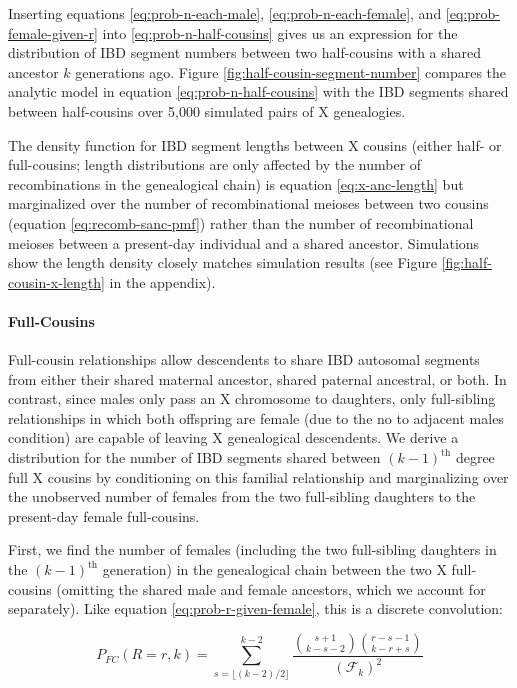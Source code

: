 \documentclass[11pt]{article}
\begin{document}
Inserting equations \eqref{eq:prob-n-each-male}, \eqref{eq:prob-n-each-female},
and \eqref{eq:prob-female-given-r} into \eqref{eq:prob-n-half-cousins} gives us
an expression for the distribution of IBD segment numbers between two
half-cousins with a shared ancestor $k$ generations ago. Figure
\ref{fig:half-cousin-segment-number} compares the analytic model in equation
\eqref{eq:prob-n-half-cousins} with the IBD segments shared between
half-cousins over 5,000 simulated pairs of X genealogies.

The density function for IBD segment lengths between X cousins (either half- or
full-cousins; length distributions are only affected by the number of
recombinations in the genealogical chain) is equation \eqref{eq:x-anc-length}
but marginalized over the number of recombinational meioses between two cousins
(equation \eqref{eq:recomb-sanc-pmf}) rather than the number of recombinational
meioses between a present-day individual and a shared ancestor. Simulations
show the length density closely matches simulation results (see Figure
\ref{fig:half-cousin-x-length} in the appendix).

\paragraph{Full-Cousins}
\label{sec:full-cousins}

Full-cousin relationships allow descendents to share IBD autosomal segments
from either their shared maternal ancestor, shared paternal ancestral, or both.
In contrast, since males only pass an X chromosome to daughters, only
full-sibling relationships in which both offspring are female (due to the no to
adjacent males condition) are capable of leaving X genealogical descendents. We
derive a distribution for the number of IBD segments shared between
$(k-1)^\text{th}$ degree full X cousins by conditioning on this familial
relationship and marginalizing over the unobserved number of females from the
two full-sibling daughters to the present-day female full-cousins.

First, we find the number of females (including the two full-sibling daughters
in the $(k-1)^\text{th}$ generation) in the genealogical chain between the two
X full-cousins (omitting the shared male and female ancestors, which we account
for separately). Like equation \eqref{eq:prob-r-given-female}, this is a
discrete convolution:

\begin{equation}
  P_{FC}(R = r, k) = \sum_{s = \lfloor (k-2)/2 \rfloor}^{k-2} \frac{{s+1 \choose k-s-2 } {r-s-1 \choose k-r+s}}{(\mathcal{F}_k)^2}
\end{equation}
\end{document}
